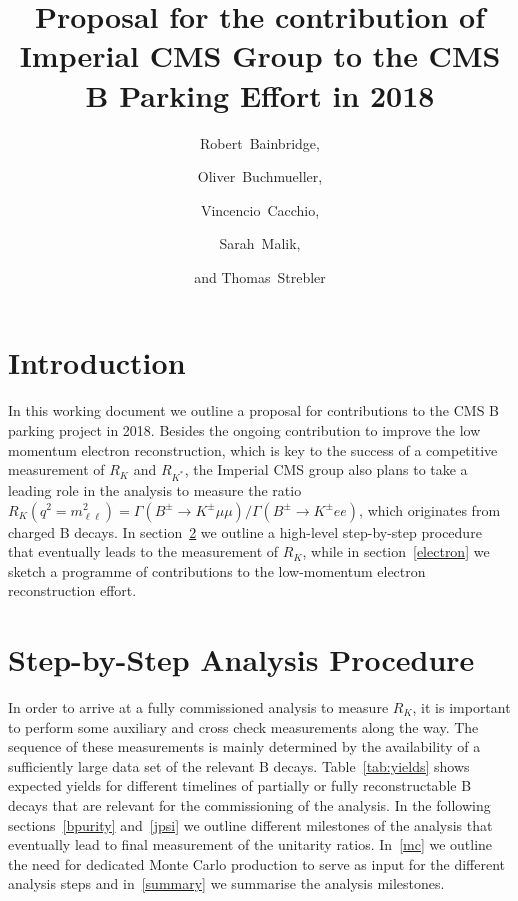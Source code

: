 \documentclass[a4paper,11pt]{article}
\title{Proposal for the contribution of Imperial CMS Group to the CMS B Parking Effort in 2018}
\author[1]{Robert~Bainbridge,}
\author[1]{Oliver~Buchmueller,}
\author[1]{Vincencio~Cacchio,}
\author[1]{Sarah~Malik,}
\author[1]{and Thomas~Strebler}
\affiliation[1]{High Energy Physics Group, Blackett Laboratory, Imperial College, Prince Consort Road, London, SW7 2AZ, United Kingdom}
\begin{document}
\maketitle
\flushbottom





\section{Introduction}
In this working document we outline a proposal for contributions to the CMS B parking project in 2018.
Besides the ongoing contribution to improve the low momentum electron reconstruction, which is key to the success of a competitive measurement of $R_K$ and $R_{K^{*}}$, the Imperial CMS group also plans to take a leading role in the analysis to measure the ratio $R_{K} (q^2 = m_{\ell\ell}^2)= \Gamma (B^{\pm} \rightarrow K^{\pm} \mu \mu )/\Gamma (B^{\pm} \rightarrow K^{\pm}  e e)$, which originates from charged B decays. In section~\ref{analysis} we outline a high-level step-by-step procedure that eventually leads to the measurement of $R_{K}$, while in section~\ref{electron} we sketch a programme of contributions to the low-momentum electron reconstruction effort. 


\section{Step-by-Step Analysis Procedure}\label{analysis}

In order to arrive at a fully commissioned analysis to measure $R_{K}$, it is important to perform some auxiliary and cross check measurements along the way. The sequence of these measurements is mainly determined by the availability of a sufficiently large data set of the relevant B decays. Table~\ref{tab:yields} shows expected yields for different timelines of partially or fully reconstructable B decays that are relevant for the commissioning of the analysis. In the following sections~\ref{bpurity} and~\ref{jpsi} we outline different milestones of the analysis that eventually lead to final measurement of the unitarity ratios. In~\ref{mc} we outline the need for dedicated Monte Carlo production to serve as input for the different analysis steps and in~\ref{summary} we summarise the analysis milestones.      
\end{document}
